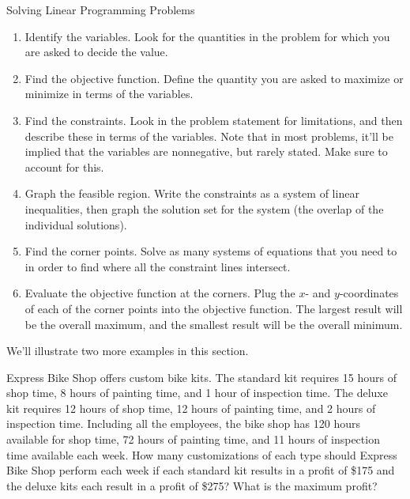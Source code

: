 \begin{proc}{Solving Linear Programming Problems}
\begin{enumerate}
\item Identify the variables.  Look for the quantities in the problem for which you are asked to decide the value.
\item Find the objective function.  Define the quantity you are asked to maximize or minimize in terms of the variables.
\item Find the constraints.  Look in the problem statement for limitations, and then describe these in terms of the variables.  Note that in most problems, it'll be implied that the variables are nonnegative, but rarely stated.  Make sure to account for this.
\item Graph the feasible region.  Write the constraints as a system of linear inequalities, then graph the solution set for the system (the overlap of the individual solutions).
\item Find the corner points.  Solve as many systems of equations that you need to in order to find where all the constraint lines intersect.
\item Evaluate the objective function at the corners.  Plug the $x$- and $y$-coordinates of each of the corner points into the objective function.  The largest result will be the overall maximum, and the smallest result will be the overall minimum.
\end{enumerate}
\end{proc}
\vfill
\pagebreak

We'll illustrate two more examples in this section.

\begin{tcolorbox}[sharp corners=all]
 Express Bike Shop offers custom bike kits.  The standard kit requires 15 hours of shop time, 8 hours of painting time, and 1 hour of inspection time.  The deluxe kit requires 12 hours of shop time, 12 hours of painting time, and 2 hours of inspection time.  Including all the employees, the bike shop has 120 hours available for shop time, 72 hours of painting time, and 11 hours of inspection time available each week.  How many customizations of each type should Express Bike Shop perform each week if each standard kit results in a profit of \$175 and the deluxe kits each result in a profit of \$275?  What is the maximum profit?
\end{tcolorbox}

